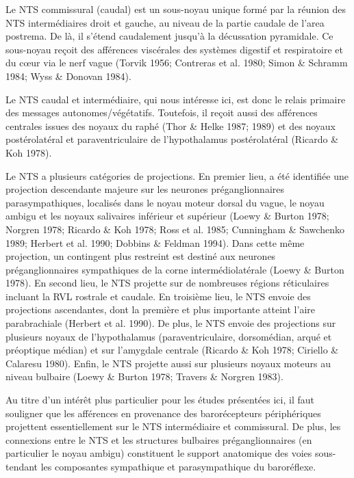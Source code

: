 \documentclass[a4paper,12pt,twoside]{report}
\begin{document}
Le NTS commissural (caudal) est un sous-noyau unique formé par la réunion des NTS intermédiaires droit et gauche, au niveau de la partie caudale de l’area postrema. De là, il s’étend caudalement jusqu’à la décussation pyramidale. Ce sous-noyau reçoit des afférences viscérales des systèmes digestif et respiratoire et du cœur via le nerf vague (Torvik 1956; Contreras et al. 1980; Simon \& Schramm 1984; Wyss \& Donovan 1984). 

Le NTS caudal et intermédiaire, qui nous intéresse ici, est donc le relais primaire des messages autonomes/végétatifs. Toutefois, il reçoit aussi des afférences centrales issues des noyaux du raphé (Thor \& Helke 1987; 1989) et des noyaux postérolatéral et paraventriculaire de l’hypothalamus postérolatéral (Ricardo \& Koh 1978). 

Le NTS a plusieurs catégories de projections. En premier lieu, a été identifiée une projection descendante majeure sur les neurones préganglionnaires parasympathiques, localisés dans le noyau moteur dorsal du vague, le noyau ambigu et les noyaux salivaires inférieur et supérieur (Loewy \& Burton 1978; Norgren 1978; Ricardo \& Koh 1978; Ross et al. 1985; Cunningham \& Sawchenko 1989; Herbert et al. 1990; Dobbins \& Feldman 1994). Dans cette même projection, un contingent plus restreint est destiné aux neurones préganglionnaires sympathiques de la corne intermédiolatérale (Loewy \& Burton 1978). En second lieu, le NTS projette sur de nombreuses régions réticulaires incluant la RVL rostrale et caudale. En troisième lieu, le NTS envoie des projections ascendantes, dont la première et plus importante atteint l’aire parabrachiale (Herbert et al. 1990). De plus, le NTS envoie des projections sur plusieurs noyaux de l’hypothalamus (paraventriculaire, dorsomédian, arqué et préoptique médian) et sur l’amygdale centrale (Ricardo \& Koh 1978; Ciriello \& Calaresu 1980). Enfin, le NTS projette aussi sur plusieurs noyaux moteurs au niveau bulbaire (Loewy \& Burton 1978; Travers \& Norgren 1983).

Au titre d'un intérêt plus particulier pour les études présentées ici, il faut souligner que les afférences en provenance des barorécepteurs périphériques projettent essentiellement sur le NTS intermédiaire et commissural. De plus, les connexions entre le NTS et les structures bulbaires préganglionnaires (en particulier le noyau ambigu) constituent le support anatomique des voies sous-tendant les composantes sympathique et parasympathique du baroréflexe.
\end{document}
